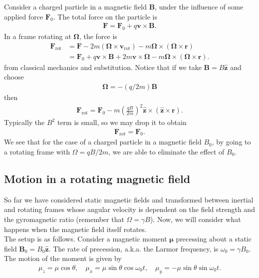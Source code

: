\documentclass{book}
\theoremstyle{definition}
\newcommand{\f}[2]{\frac{#1}{#2}}
\newcommand{\lp}{\left(}
\newcommand{\rp}{\right)}
\begin{document}
Consider a charged particle in a magnetic field $\bm{B}$, under the influence of some applied force $\bm{F}_0$. The total force on the particle is 
\begin{align*}
	\bm{F} = \bm{F}_0 + q\bm{v}\times \bm{B}.
\end{align*}
In a frame rotating at $\bm{\Omega}$, the force is 
\begin{align*}
\bm{F}_{\text{rot}} &= \bm{F} - 2m(\bm{\Omega}\times \bm{v}_\text{rot}) - m\bm{\Omega} \times (\bm{\Omega}\times \bm{r})\\
&= \bm{F}_0 + q\bm{v}\times \bm{B} + 2m\bm{v}\times \bm{\Omega} - m\bm{\Omega}\times (\bm{\Omega}\times \bm{r}).
\end{align*}
from classical mechanics and substitution. Notice that if we take $\bm{B} = B\hat{\bm{z}}$ and choose 
\begin{align*}
	\bm{\Omega} = -(q/2m)\bm{B}
\end{align*}
then 
\begin{align*}
	\bm{F}_\text{rot} = \bm{F}_0 - m\lp \f{qB}{2m} \rp^2 \hat{\bm{z}} \times (\hat{\bm{z}} \times \bm{r}).
\end{align*}
Typically the $B^2$ term is small, so we may drop it to obtain 
\begin{align*}
	\bm{F}_\text{rot} = \bm{F}_0.
\end{align*}
We see that for the case of a charged particle in a magnetic field $B_0$, by going to a rotating frame with $\Omega = qB/2m $, we are able to eliminate the effect of $B_0$.





\subsection{Motion in a rotating magnetic field}

So far we have considered static magnetic fields and transformed between inertial and rotating frames whose angular velocity is dependent on the field strength and the gyromagnetic ratio (remember that $\Omega = \gamma B$). Now, we will consider what happens when the magnetic field itself rotates. \\


The setup is as follows. Consider a magnetic moment $\bm{\mu}$ precessing about a static field $\bm{B}_0 = B_0 \hat{\bm{z}}$. The rate of precession, a.k.a. the Larmor frequency, is $\omega_0 = \gamma B_0$. The motion of the moment is given by 
\begin{align*}
	\mu_z = \mu\cos\theta, \quad \mu_x = \mu\sin\theta \cos\omega_0t, \quad \mu_y = -\mu\sin\theta \sin\omega_0 t.
\end{align*}
\end{document}
